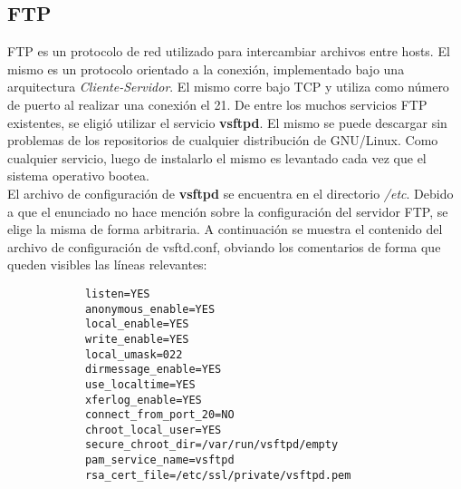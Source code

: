 	\subsection{FTP}
		\indent FTP es un protocolo de red utilizado para intercambiar archivos entre hosts. El mismo es un protocolo orientado a la conexión,	
		implementado bajo una arquitectura \textit{Cliente-Servidor}. El mismo corre bajo TCP y utiliza como número de puerto al realizar
		una conexión el 21. De entre los muchos servicios FTP existentes, se eligió utilizar el 
		servicio \textbf{vsftpd}. El mismo se puede descargar sin problemas de los repositorios de cualquier distribución de GNU/Linux. Como
		cualquier servicio, luego de instalarlo el mismo es levantado cada vez que el sistema operativo bootea. \\
		\indent El archivo de configuración de \textbf{vsftpd} se encuentra en el directorio \textit{/etc}. Debido a que el enunciado no 
		hace mención sobre la configuración del servidor FTP, se elige la misma de forma arbitraria. A continuación se muestra el contenido
		del archivo de configuración de vsftd.conf, obviando los comentarios de forma que queden visibles las líneas relevantes:	
		
		\begin{verbatim}
			listen=YES
			anonymous_enable=YES
			local_enable=YES
			write_enable=YES
			local_umask=022
			dirmessage_enable=YES
			use_localtime=YES
			xferlog_enable=YES
			connect_from_port_20=NO
			chroot_local_user=YES
			secure_chroot_dir=/var/run/vsftpd/empty
			pam_service_name=vsftpd
			rsa_cert_file=/etc/ssl/private/vsftpd.pem
		\end{verbatim}

